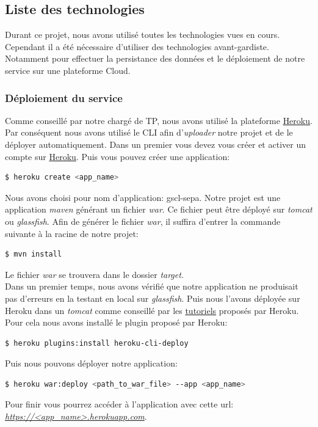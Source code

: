 \documentclass{article}
\begin{document}
    \subsection{Liste des technologies}
      Durant ce projet, nous avons utilisé toutes les technologies vues en cours. Cependant il a été nécessaire 
      d'utiliser des technologies avant-gardiste.
      Notamment pour effectuer la persistance des données et le déploiement de notre service sur une plateforme Cloud.
      \subsubsection{Déploiement du service}
	Comme conseillé par notre chargé de TP, nous avons utilisé la plateforme \href{https://www.heroku.com}{Heroku}.
	Par conséquent nous avons utilisé le CLI afin d'\emph{uploader} notre projet et de le déployer automatiquement.
	Dans un premier vous devez vous créer et activer un compte sur \href{https://www.heroku.com}{Heroku}. Puis vous pouvez créer une application:
	\begin{lstlisting}[language=bash]
    $ heroku create <app_name>
	\end{lstlisting}
	Nous avons choisi pour nom d'application: gscl-sepa.
	Notre projet est une application \emph{maven} générant un fichier \emph{war}. Ce fichier peut être déployé sur  \emph{tomcat} ou  \emph{glassfish}. Afin de générer
	le fichier  \emph{war}, il suffira d'entrer la commande suivante à la racine de notre projet:
	\begin{lstlisting}[language=bash]
    $ mvn install
	\end{lstlisting}
	Le fichier  \emph{war} se trouvera dans le dossier \emph{target}. \\
	Dans un premier temps, nous avons vérifié que notre application ne produisait pas d'erreurs en la testant en local sur  \emph{glassfish}.
	Puis nous l'avons déployée sur Heroku dans un  \emph{tomcat} comme conseillé par les \href{https://devcenter.heroku.com/articles/war-deployment}{tutoriels} proposés par Heroku.
	Pour cela nous avons installé le plugin proposé par Heroku:
	\begin{lstlisting}[language=bash]
    $ heroku plugins:install heroku-cli-deploy
	\end{lstlisting}
	Puis nous pouvons déployer notre application:
	\begin{lstlisting}[language=bash]
    $ heroku war:deploy <path_to_war_file> --app <app_name>
	\end{lstlisting}
	Pour finir vous pourrez accéder à l'application avec cette url:\\ \emph{\url{https://<app_name>.herokuapp.com}}.
\end{document}
